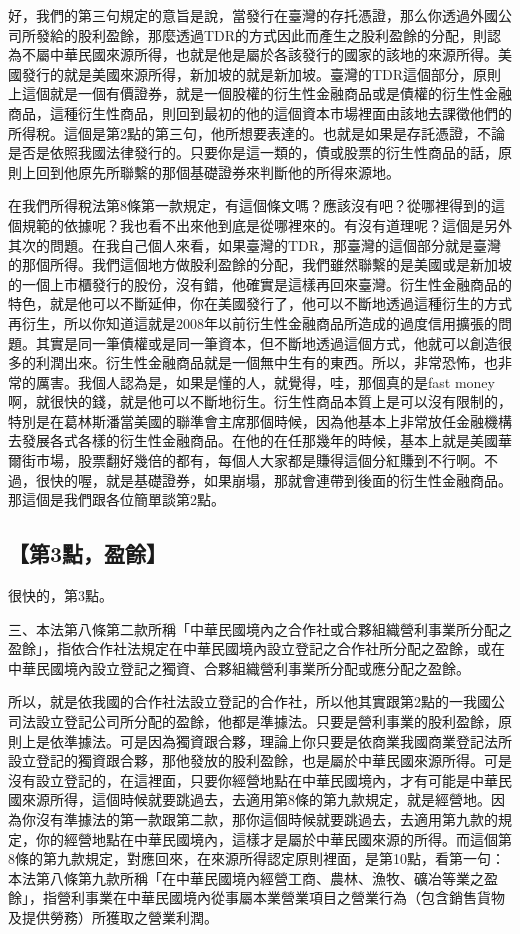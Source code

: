 \documentclass[]{ctexbook}
\begin{document}
好，我們的第三句規定的意旨是說，當發行在臺灣的存托憑證，那么你透過外國公司所發給的股利盈餘，那麼透過TDR的方式因此而產生之股利盈餘的分配，則認為不屬中華民國來源所得，也就是他是屬於各該發行的國家的該地的來源所得。美國發行的就是美國來源所得，新加坡的就是新加坡。臺灣的TDR這個部分，原則上這個就是一個有價證券，就是一個股權的衍生性金融商品或是債權的衍生性金融商品，這種衍生性商品，則回到最初的他的這個資本市場裡面由該地去課徵他們的所得稅。這個是第2點的第三句，他所想要表達的。也就是如果是存託憑證，不論是否是依照我國法律發行的。只要你是這一類的，債或股票的衍生性商品的話，原則上回到他原先所聯繫的那個基礎證券來判斷他的所得來源地。

在我們所得稅法第8條第一款規定，有這個條文嗎？應該沒有吧？從哪裡得到的這個規範的依據呢？我也看不出來他到底是從哪裡來的。有沒有道理呢？這個是另外其次的問題。在我自己個人來看，如果臺灣的TDR，那臺灣的這個部分就是臺灣的那個所得。我們這個地方做股利盈餘的分配，我們雖然聯繫的是美國或是新加坡的一個上市櫃發行的股份，沒有錯，他確實是這樣再回來臺灣。衍生性金融商品的特色，就是他可以不斷延伸，你在美國發行了，他可以不斷地透過這種衍生的方式再衍生，所以你知道這就是2008年以前衍生性金融商品所造成的過度信用擴張的問題。其實是同一筆債權或是同一筆資本，但不斷地透過這個方式，他就可以創造很多的利潤出來。衍生性金融商品就是一個無中生有的東西。所以，非常恐怖，也非常的厲害。我個人認為是，如果是懂的人，就覺得，哇，那個真的是fast money啊，就很快的錢，就是他可以不斷地衍生。衍生性商品本質上是可以沒有限制的，特別是在葛林斯潘當美國的聯準會主席那個時候，因為他基本上非常放任金融機構去發展各式各樣的衍生性金融商品。在他的在任那幾年的時候，基本上就是美國華爾街市場，股票翻好幾倍的都有，每個人大家都是賺得這個分紅賺到不行啊。不過，很快的喔，就是基礎證券，如果崩塌，那就會連帶到後面的衍生性金融商品。那這個是我們跟各位簡單談第2點。

\hypertarget{ux7b2c3ux9edeux76c8ux9918}{%
\subsection{【第3點，盈餘】}\label{ux7b2c3ux9edeux76c8ux9918}}

很快的，第3點。

三、本法第八條第二款所稱「中華民國境內之合作社或合夥組織營利事業所分配之盈餘」，指依合作社法規定在中華民國境內設立登記之合作社所分配之盈餘，或在中華民國境內設立登記之獨資、合夥組織營利事業所分配或應分配之盈餘。

所以，就是依我國的合作社法設立登記的合作社，所以他其實跟第2點的一我國公司法設立登記公司所分配的盈餘，他都是準據法。只要是營利事業的股利盈餘，原則上是依準據法。可是因為獨資跟合夥，理論上你只要是依商業我國商業登記法所設立登記的獨資跟合夥，那他發放的股利盈餘，也是屬於中華民國來源所得。可是沒有設立登記的，在這裡面，只要你經營地點在中華民國境內，才有可能是中華民國來源所得，這個時候就要跳過去，去適用第8條的第九款規定，就是經營地。因為你沒有準據法的第一款跟第二款，那你這個時候就要跳過去，去適用第九款的規定，你的經營地點在中華民國境內，這樣才是屬於中華民國來源的所得。而這個第8條的第九款規定，對應回來，在來源所得認定原則裡面，是第10點，看第一句：本法第八條第九款所稱「在中華民國境內經營工商、農林、漁牧、礦冶等業之盈餘」，指營利事業在中華民國境內從事屬本業營業項目之營業行為（包含銷售貨物及提供勞務）所獲取之營業利潤。
\end{document}
